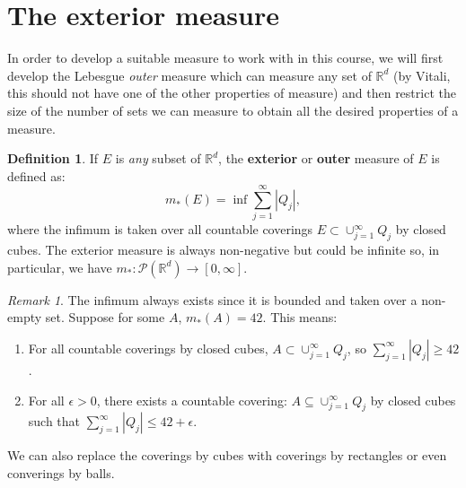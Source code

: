 \documentclass[a4paper, 11pt]{book}
\theoremstyle{definition}
\newtheorem{definition}{Definition}[section]
\theoremstyle{remark}
\newtheorem*{remark}{Remark}
\begin{document}
    \newpage

    \section{The exterior measure}
    
    In order to develop a suitable measure to work with in this course, we will first develop the Lebesgue \textit{outer} measure
    which can measure any set of $\mathbb{R}^d$ (by Vitali, this should not have one of the other properties of measure) and then
    restrict the size of the number of sets we can measure to obtain all the desired properties of a measure.\\

    \begin{definition}
        If $E$ is \textit{any} subset of $\mathbb{R}^d$, the \textbf{exterior} or \textbf{outer} measure of $E$ is defined as:
        \[ m_*(E) = \inf\sum_{j=1}^{\infty} |Q_j|,\]
        where the infimum is taken over all countable coverings $E\subset \cup_{j=1}^{\infty} Q_j$ by closed cubes. The exterior
        measure is always non-negative but could be infinite so, in particular, we have $m_*: \mathcal{P}(\mathbb{R}^d) \to [0,\infty]$.
    \end{definition}

    \begin{remark}
        The infimum always exists since it is bounded and taken over a non-empty set. Suppose for some $A$, $m_*(A) = 42$. This
        means:
        \begin{enumerate}
            \item For all countable coverings by closed cubes, $A\subset\cup_{j=1}^{\infty} Q_j$, so $\sum_{j=1}^{\infty} |Q_j|\geq 42$.
            \item For all $\epsilon>0$, there exists a countable covering: $A\subseteq\cup_{j=1}^{\infty} Q_j$ by closed cubes
                such that $\sum_{j=1}^{\infty} |Q_j| \leq 42 + \epsilon$.
        \end{enumerate}
        We can also replace the coverings by cubes with coverings by rectangles or even converings by balls.
    \end{remark}
\end{document}

